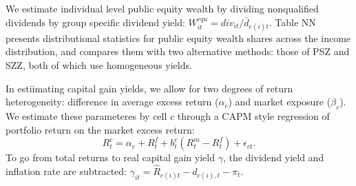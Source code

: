 \documentclass[12pt]{article}
\newcommand{\be}{\begin{equation}}
\newcommand{\ee}{\end{equation}}
\begin{document}
We estimate individual level public equity wealth by dividing nonqualified dividends by group specific dividend yield: $W^{equ}_{it} = div_{it}/\bar{d}_{c(i)t}$. Table NN presents distributional statistics for public equity wealth shares across the income distribution, and compares them with two alternative methods: those of PSZ and SZZ, both of which use homogeneous yields. 

In estiimating capital gain yields, we allow for two degrees of return heterogeneity: difference in average excess return ($\alpha_c$) and market exposure ($\beta_c$). We estimate these parameteres by cell $c$ through a CAPM style regression of portfolio return on the market excess return:
\be
R^c_t = \alpha_c + R^f_t + b^c_t (R^m_t - R^f_t) + \epsilon_{ct}.
\ee
To go from total returns to real capital gain yield $\gamma$, the dividend yield and inflation rate are subtracted: $\gamma_{it} = \hat{R}_{c(i)t} -  d_{c(i),t} - \pi_{t}$. 

\clearpage



\end{document}

